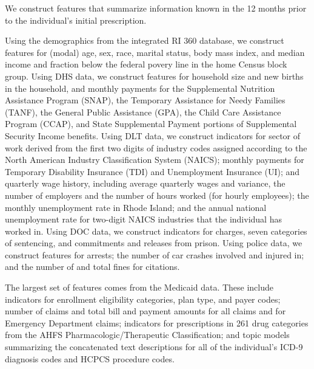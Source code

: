 \documentclass[11pt, letter]{article}
\begin{document}
We construct features that summarize information known in the 12 months prior to the individual's initial prescription.

Using the demographics from the integrated RI 360 database, we construct features for (modal) age, sex, race, marital status, body mass index, and median income and fraction below the federal povery line in the home Census block group. Using DHS data, we construct features for household size and new births in the household, and monthly payments for the Supplemental Nutrition Assistance Program (SNAP), the Temporary Assistance for Needy Families (TANF), the General Public Assistance (GPA), the Child Care Assistance Program (CCAP), and State Supplemental Payment portions of Supplemental Security Income benefits. Using DLT data, we construct indicators for sector of work derived from the first two digits of industry codes assigned according to the North American Industry Classification System (NAICS); monthly payments for Temporary Disability Insurance (TDI) and Unemployment Insurance (UI); and quarterly wage history, including average quarterly wages and variance, the number of employers and the number of hours worked (for hourly employees); the monthly unemployment rate in Rhode Island; and the annual national unemployment rate for two-digit NAICS industries that the individual has worked in. Using DOC data, we construct indicators for charges, seven categories of sentencing, and commitments and releases from prison. Using police data, we construct features for arrests; the number of car crashes involved and injured in; and the number of and total fines for citations.

The largest set of features comes from the Medicaid data. These include indicators for enrollment eligibility categories, plan type, and payer codes; number of claims and total bill and payment amounts for all claims and for Emergency Department claims; indicators for prescriptions in 261 drug categories from the AHFS Pharmacologic/Therapeutic Classification; and topic models summarizing the concatenated text descriptions for all of the individual's ICD-9 diagnosis codes and HCPCS procedure codes.
\end{document}
